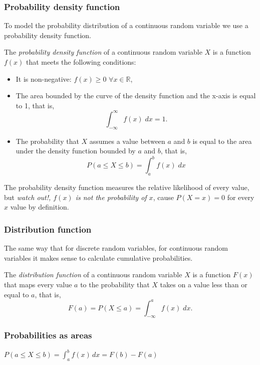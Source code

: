 \begin{frame}
\frametitle{Probability density function}
To model the probability distribution of a continuous random variable we use a probability density function.

\begin{definition}
The \emph{probability density function} of a continuous random variable $X$ is a function $f(x)$ that meets the
following conditions:
\begin {itemize}
\item It is non-negative: $f(x)\geq 0$ $\forall x\in \mathbb{R}$,
\item The area bounded by the curve of the density function and the x-axis is equal to 1, that is,
\[
\int_{-\infty}^{\infty} f(x)\; dx = 1.
\]
\item The probability that $X$ assumes a value between $a$ and $b$ is equal to the area under the density function
bounded by $a$ and $b$, that is,
\[
P(a\leq X\leq b) = \int_a^b f(x)\; dx
\]
\end{itemize}
\end{definition}

The probability density function measures the relative likelihood of every value, but \alert{\emph{watch out!, $f(x)$ is
not the probability of $x$}}, cause $P(X=x)=0$ for every $x$ value by definition.
\end{frame}


\begin{frame}
\frametitle{Distribution function}
The same way that for discrete random variables, for continuous random variables it makes sense to calculate cumulative
probabilities.
\begin{definition}
The \emph{distribution function} of a continuous random variable $X$ is a function $F(x)$ that maps every value $a$ to
the probability that $X$ takes on a value less than or equal to $a$, that is,
\[
F(a) = P(X\leq a) = \int_{-\infty}^{a} f(x)\; dx.
\]
\end{definition}

\end{frame}


\begin{frame}
\frametitle{Probabilities as areas}

\begin{center}
$\displaystyle P(a\leq X\leq b) = \int_a^b f(x)\, dx = F(b)-F(a)$
\end{center}
\end{frame}



